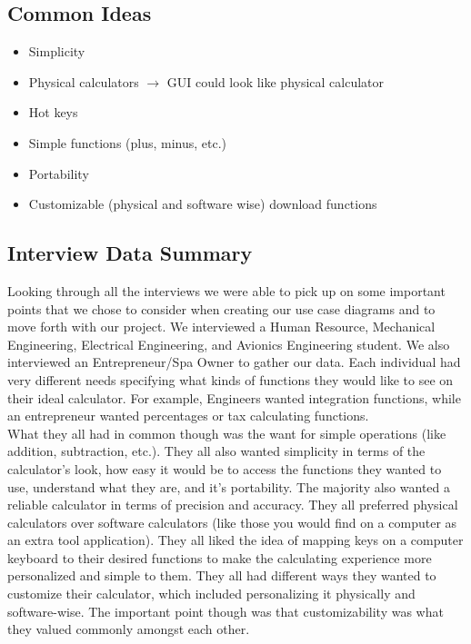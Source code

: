 \documentclass[a4paper]{article}
\begin{document}
\subsection{Common Ideas}
\begin{itemize}
\item Simplicity 
\item Physical calculators $\rightarrow$ GUI could look like physical calculator
\item Hot keys 
\item Simple functions (plus, minus, etc.) 
\item Portability 
\item Customizable (physical and software wise)  download functions 
\end{itemize}

\subsection{Interview Data Summary}

Looking through all the interviews we were able to pick up on some important points that we chose to consider when creating our use case diagrams and to move forth with our project. We interviewed a Human Resource, Mechanical Engineering, Electrical Engineering, and Avionics Engineering student. We also interviewed an Entrepreneur/Spa Owner to gather our data. Each individual had very different needs specifying what kinds of functions they would like to see on their ideal calculator. For example, Engineers wanted integration functions, while an entrepreneur wanted percentages or tax calculating functions. \\

What they all had in common though was the want for simple operations (like addition, subtraction, etc.). They all also wanted simplicity in terms of the calculator's look, how easy it would be to access the functions they wanted to use, understand what they are, and it’s portability. The majority also wanted a reliable calculator in terms of precision and accuracy. They all preferred physical calculators over software calculators (like those you would find on a computer as an extra tool application). They all liked the idea of mapping keys on a computer keyboard to their desired functions to make the calculating experience more personalized and simple to them. They all had different ways they wanted to customize their calculator, which included personalizing it physically and software-wise. The important point though was that customizability was what they valued commonly amongst each other. \\
\end{document}
